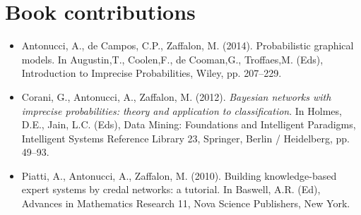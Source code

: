 \documentclass[11pt,a4paper]{moderncv}
\begin{document}
\section{Book contributions} 
\begin{itemize}
\item Antonucci, A., de Campos, C.P., Zaffalon, M. (2014). Probabilistic graphical models. In Augustin,T., Coolen,F., de Cooman,G., Troffaes,M. (Eds), Introduction to Imprecise Probabilities, Wiley, pp. 207--229.
\item Corani, G., Antonucci, A., Zaffalon, M. (2012). \textit{Bayesian networks with imprecise probabilities: theory and application to classification}. In Holmes, D.E., Jain, L.C. (Eds), Data Mining: Foundations and Intelligent Paradigms, Intelligent Systems Reference Library 23, Springer, Berlin / Heidelberg, pp. 49--93.
\item Piatti, A., Antonucci, A., Zaffalon, M. (2010). Building knowledge-based expert systems by credal networks: a tutorial. In Baswell, A.R. (Ed), Advances in Mathematics Research 11, Nova Science Publishers, New York.
\end{itemize}
\end{document}
